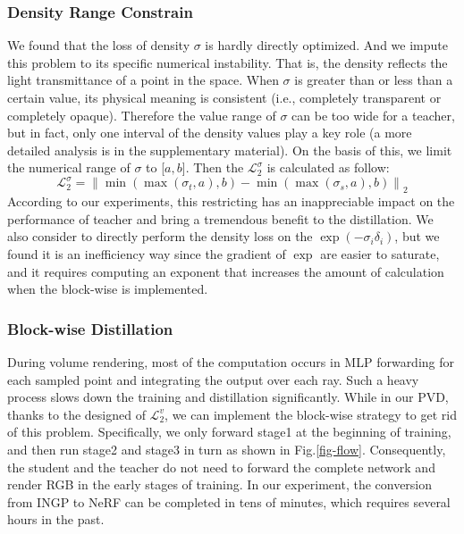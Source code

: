\documentclass[letterpaper]{article} \usepackage{aaai23}  \usepackage{times}  \usepackage{helvet}  \usepackage{courier}  \usepackage[hyphens]{url}  \usepackage{graphicx} \urlstyle{rm} \def\UrlFont{\rm}  \usepackage{natbib}  \usepackage{caption} \frenchspacing  \setlength{\pdfpagewidth}{8.5in}  \setlength{\pdfpageheight}{11in}  \usepackage{multirow}
\begin{document}
\subsubsection{Density Range Constrain}
We found that the loss of density $\sigma$ is hardly directly optimized. And we impute this problem to its specific numerical instability. That is, the density reflects the light transmittance of a point in the space. When $\sigma$ is greater than or less than a certain value, its physical meaning is consistent (i.e., completely transparent or completely opaque). Therefore the value range of $\sigma$ can be too wide for a teacher, but in fact, only one interval of the density values play a key role (a more detailed analysis is in the supplementary material). On the basis of this, we limit the numerical range of $\sigma$ to [$a, b$]. Then the $\mathcal{L}_{2}^{\sigma}$ is calculated as follow:
\begin{equation}
\mathcal{L}_{2}^{\sigma} = \left \| \min (\max (\sigma_{t}, a), b) - \min (\max (\sigma_{s}, a), b) \right \|_2
\end{equation}
According to our experiments, this restricting has an inappreciable impact on the performance of teacher and bring a tremendous benefit to the distillation. We also consider to directly perform the density loss on the $\exp(-\sigma_{i}\delta_{i})$, but we found it is an inefficiency way since the gradient of $\exp$ are easier to saturate, and it requires computing an exponent that increases the amount of calculation when the block-wise is implemented.






\subsubsection{Block-wise Distillation}
During volume rendering, most of the computation occurs in MLP forwarding for each sampled point and integrating the output over each ray. Such a heavy process slows down the training and distillation significantly.
While in our PVD, thanks to the designed of $\mathcal{L}_{2}^{v}$, we can implement the block-wise strategy to get rid of this problem. Specifically, we only forward stage1 at the beginning of training, and then run stage2 and stage3 in turn as shown in Fig.\ref{fig-flow}. Consequently, the student and the teacher do not need to forward the complete network and render RGB in the early stages of training. In our experiment, the conversion from INGP to NeRF can be completed in tens of minutes, which requires several hours in the past.
\end{document}
